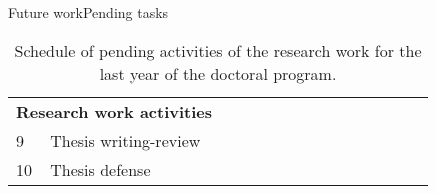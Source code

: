 \begin{frame}{Future work}{Pending tasks}
\begin{table}
{\begin{tabular}{lllllllllllllll}
\multicolumn{2}{c}{\rule{0pt}{4ex}\textbf{Research work activities}}                                                                                     &                           &                           &                           &                           &                           &                           &                           &                           &                           &                           &                           &                           &                           \\
9  & \rule{0pt}{2ex}Thesis writing-review                                                                                                       &                           &                           &                           &                           &                           &                           &                           & \cellcolor[HTML]{00D2CB} & \cellcolor[HTML]{00D2CB} & \cellcolor[HTML]{00D2CB} & \cellcolor[HTML]{00D2CB} & \cellcolor[HTML]{00D2CB} &                           \\
\cmidrule[0.25pt]{1-15}
10 & Thesis defense                                                                                                              &                           &                           &                           &                           &                           &                           &                           &                           &                           &                           &                           &                           & \cellcolor[HTML]{00D2CB} \\
\bottomrule
\end{tabular}
}
\caption{Schedule of pending activities of the research work for the last year of the doctoral program.}
\label{tab:schedule}
\end{table}
\end{frame}

